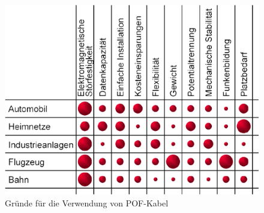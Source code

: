 \begin{figure}[h]
    \begin{center}
        \begin{minipage}[t]{\textwidth}
            \begin{center}
                \includegraphics[height=0.2\textheight]{Bilder/Optische_Wellenleiter_Die_Polymer_Optische_Faser/Allgemeines/pofgrund.png}
                \caption[Gründe für die Verwendung von POF-Kabel \newline \url{http://www.pofac.fh-nuernberg.de/pofac/de/was_sind_pof/images/warum_pof.png} (zuletzt aufgerufen am 19.09.2015)]{Gründe für die Verwendung von POF-Kabel}
                \label{fig:pofgrund}
            \end{center}
        \end{minipage}
    \end{center}
\end{figure}
